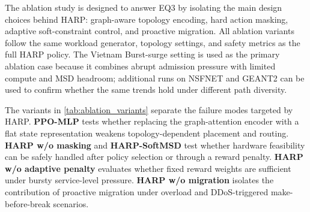 \documentclass[final,5p]{elsarticle}
\begin{document}
The ablation study is designed to answer EQ3 by isolating the main design choices behind HARP: graph-aware topology encoding, hard action masking, adaptive soft-constraint control, and proactive migration. All ablation variants follow the same workload generator, topology settings, and safety metrics as the full HARP policy. The Vietnam Burst-surge setting is used as the primary ablation case because it combines abrupt admission pressure with limited compute and MSD headroom; additional runs on NSFNET and GEANT2 can be used to confirm whether the same trends hold under different path diversity.

The variants in \autoref{tab:ablation_variants} separate the failure modes targeted by HARP. \textbf{PPO-MLP} tests whether replacing the graph-attention encoder with a flat state representation weakens topology-dependent placement and routing. \textbf{HARP w/o masking} and \textbf{HARP-SoftMSD} test whether hardware feasibility can be safely handled after policy selection or through a reward penalty. \textbf{HARP w/o adaptive penalty} evaluates whether fixed reward weights are sufficient under bursty service-level pressure. \textbf{HARP w/o migration} isolates the contribution of proactive migration under overload and DDoS-triggered make-before-break scenarios.
\end{document}
